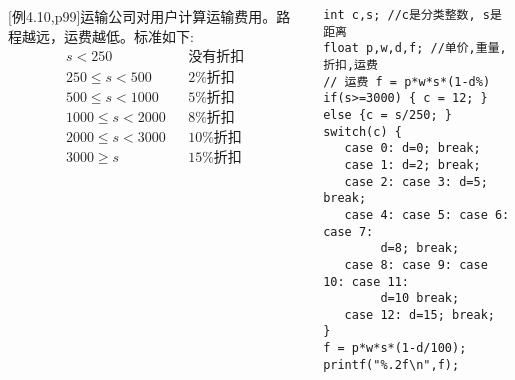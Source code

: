 \begin{frame}
\begin{columns}[T]
\small
[例4.10,p99]运输公司对用户计算运输费用。路程越远，运费越低。标准如下:  
\begin{align*}
s<250 &&\text{没有折扣}\\
250\le s < 500 &&\text{2\%折扣}\\
500\le s < 1000 &&\text{5\%折扣}\\
1000\le s < 2000 &&\text{8\%折扣}\\
2000\le s < 3000 &&\text{10\%折扣}\\
3000\ge s  &&\text{15\%折扣}
\end{align*}
\begin{lstlisting}
int c,s; //c是分类整数, s是距离
float p,w,d,f; //单价,重量,折扣,运费
// 运费 f = p*w*s*(1-d%) 
if(s>=3000) { c = 12; } else {c = s/250; }
switch(c) {
   case 0: d=0; break;
   case 1: d=2; break;
   case 2: case 3: d=5; break;
   case 4: case 5: case 6: case 7: 
        d=8; break;
   case 8: case 9: case 10: case 11: 
        d=10 break;
   case 12: d=15; break;
}
f = p*w*s*(1-d/100);  printf("%.2f\n",f);
\end{lstlisting}
\end{columns}
\end{frame}
